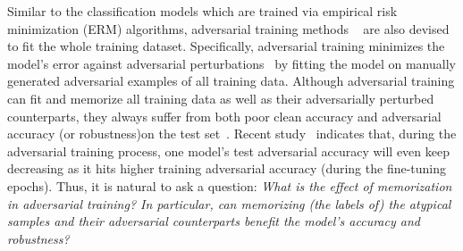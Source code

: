 Similar to the classification models which are trained via empirical risk minimization (ERM) algorithms, adversarial training methods
~\cite{madry2017towards, kurakin2016adversarial} are also devised to fit the whole training dataset. Specifically, adversarial training minimizes the model's error against adversarial perturbations~\cite{goodfellow2014explaining, szegedy2013intriguing} by fitting the model on manually generated adversarial examples of all training data. Although adversarial training can fit and memorize all training data as well as their adversarially perturbed counterparts, they always suffer from both poor clean accuracy and adversarial accuracy (or robustness)\footnotemark on the test set~\cite{tsipras2018robustness, schmidt2018adversarially}. Recent study~\cite{rice2020overfitting} indicates that, during the adversarial training process, one model's test adversarial accuracy will even keep decreasing as it hits higher training adversarial accuracy (during the fine-tuning epochs). Thus, it is natural to ask a question: \textit{What is the effect of memorization in adversarial training? In particular, can memorizing (the labels of) the atypical samples and their adversarial counterparts benefit the model's accuracy and robustness?}


